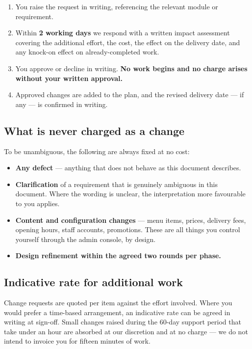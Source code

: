 \documentclass[11pt,a4paper]{article}
\begin{document}
\begin{enumerate}[leftmargin=17pt]
\item You raise the request in writing, referencing the relevant module or requirement.
\item Within \textbf{2 working days} we respond with a written impact assessment covering
the additional effort, the cost, the effect on the delivery date, and any knock-on effect
on already-completed work.
\item You approve or decline in writing. \textbf{No work begins and no charge arises
without your written approval.}
\item Approved changes are added to the plan, and the revised delivery date --- if any ---
is confirmed in writing.
\end{enumerate}

\subsection{What is never charged as a change}

To be unambiguous, the following are always fixed at no cost:

\begin{itemize}
\item \textbf{Any defect} --- anything that does not behave as this document describes.
\item \textbf{Clarification} of a requirement that is genuinely ambiguous in this
document. Where the wording is unclear, the interpretation more favourable to you applies.
\item \textbf{Content and configuration changes} --- menu items, prices, delivery fees,
opening hours, staff accounts, promotions. These are all things you control yourself
through the admin console, by design.
\item \textbf{Design refinement within the agreed two rounds per phase.}
\end{itemize}

\subsection{Indicative rate for additional work}

Change requests are quoted per item against the effort involved. Where you would prefer a
time-based arrangement, an indicative rate can be agreed in writing at sign-off. Small
changes raised during the 60-day support period that take under an hour are absorbed at
our discretion and at no charge --- we do not intend to invoice you for fifteen minutes
of work.
\end{document}
